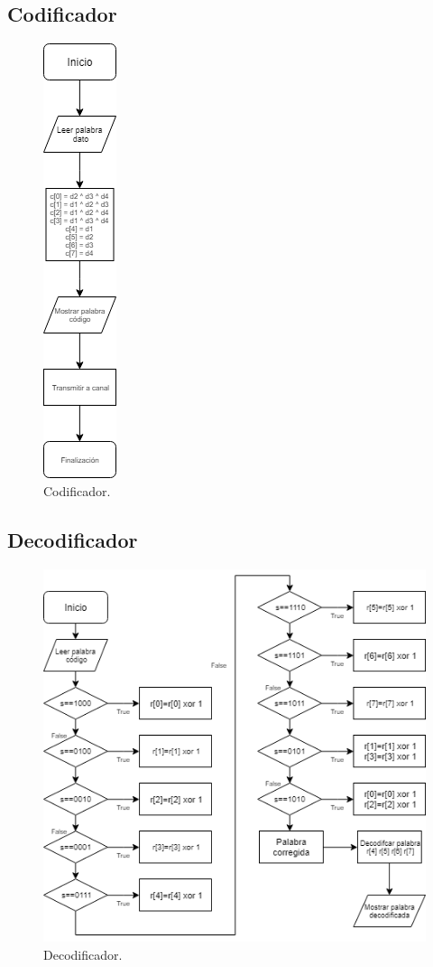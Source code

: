 \documentclass[12pt,letterpaper]{article}
\begin{document}
\newpage
\subsection{Codificador}
\begin{figure}[ht]
    \centering
    \includegraphics[width=.15\textwidth]{flujo1.png}
    \caption{Codificador.}
\end{figure}

\newpage
\subsection{Decodificador}
\begin{figure}[ht]
    \centering
    \includegraphics[width=.9\textwidth]{flujo2.png}
    \caption{Decodificador.}
\end{figure}
\end{document}
